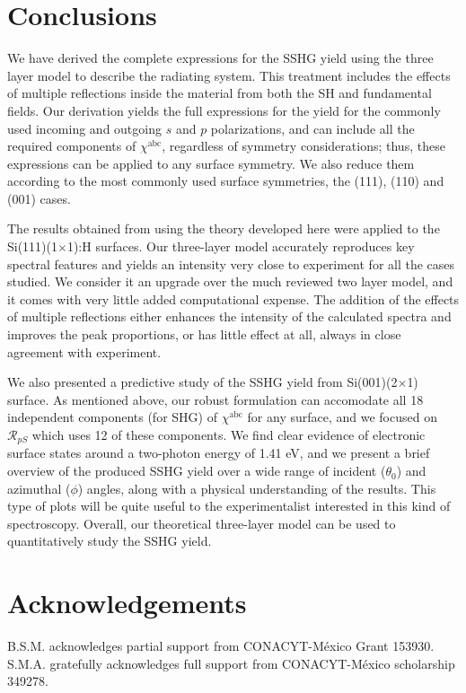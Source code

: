\documentclass[aps,prb,10pt,showpacs,letterpaper,twocolumn]{revtex4-1}
\begin{document}

\section{Conclusions}\label{sec:conclusions}

We have derived the complete expressions for the SSHG yield using the three
layer model to describe the radiating system. This treatment includes the
effects of multiple reflections inside the material from both the SH and
fundamental fields. Our derivation yields the full expressions for the yield for
the commonly used incoming and outgoing $s$ and $p$ polarizations, and can
include all the required components of $\chi^{\mathrm{abc}}$, regardless of
symmetry considerations; thus, these expressions can be applied to any surface
symmetry. We also reduce them according to the most commonly used surface
symmetries, the (111), (110) and (001) cases.

The results obtained from using the theory developed here were applied to the
Si(111)(1$\times$1):H surfaces. Our three-layer model accurately reproduces key
spectral features and yields an intensity very close to experiment for all the
cases studied. We consider it an upgrade over the much reviewed two layer
model,\cite{mizrahiJOSA88} and it comes with very little added computational
expense. The addition of the effects of multiple reflections either enhances the
intensity of the calculated spectra and improves the peak proportions, or has
little effect at all, always in close agreement with experiment.

We also presented a predictive study of the SSHG yield from Si(001)(2$\times$1)
surface. As mentioned above, our robust formulation can accomodate all 18
independent components (for SHG) of $\chi^{\mathrm{abc}}$ for any surface, and
we focused on $\mathcal{R}_{pS}$ which uses 12 of these components. We find
clear evidence of electronic surface states around a two-photon energy of 1.41
eV, and we present a brief overview of the produced SSHG yield over a wide range
of incident ($\theta_{0}$) and azimuthal ($\phi$) angles, along with a physical
understanding of the results. This type of plots will be quite useful to the
experimentalist interested in this kind of spectroscopy. Overall, our
theoretical three-layer model can be used to quantitatively study the SSHG
yield.




\section{Acknowledgements}\label{sec:acknowledgements}

B.S.M. acknowledges partial support from CONACYT-M\'exico Grant 153930. S.M.A.
gratefully acknowledges full support from CONACYT-M\'exico scholarship 349278.



\end{document}
